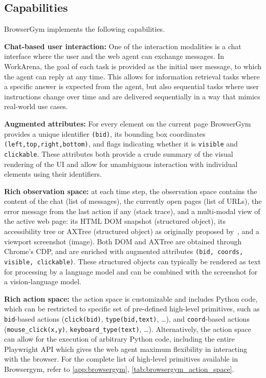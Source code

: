 \documentclass{article}
\theoremstyle{plain}
\theoremstyle{definition}
\theoremstyle{remark}
\begin{document}
\subsection{Capabilities}\label{sec:browsergym-features}

BrowserGym implements the following capabilities.

\textbf{Chat-based user interaction:} One of the interaction modalities is a chat interface where the user and the web agent can exchange messages. In WorkArena, the goal of each task is provided as the initial user message, to which the agent can reply at any time. This allows for information retrieval tasks where a specific answer is expected from the agent, but also sequential tasks where user instructions change over time and are delivered sequentially in a way that mimics real-world use cases.

\textbf{Augmented attributes:} For every element on the current page BrowserGym provides a unique identifier \verb|(bid)|, its bounding box coordinates \verb|(left,top,right,bottom)|, and flags indicating whether it is \verb|visible| and \verb|clickable|. These attributes both provide a crude summary of the visual rendering of the UI and allow for unambiguous interaction with individual elements using their identifiers.

\textbf{Rich observation space:} at each time step, the observation space contains the content of the chat (list of messages), the currently open pages (list of URLs), the error message from the last action if any (stack trace), and a multi-modal view of the active web page: its HTML DOM snapshot (structured object), its accessibility tree or AXTree (structured object) as originally proposed by~\citet{zhou2023webarena}, and a viewport screenshot (image). Both DOM and AXTree are obtained through Chrome's CDP, and are enriched with augmented attributes \verb|(bid, coords, visible, clickable)|. These structured objects can typically be rendered as text for processing by a language model and can be combined with the screenshot for a vision-language model.

\textbf{Rich action space:} the action space is customizable and includes Python code, which can be restricted to specific set of pre-defined high-level primitives, such as \verb|bid|-based actions (\verb|click(bid)|, \verb|type(bid,text)|, \dots), and \verb|coord|-based actions (\texttt{mouse\_click(x,y)}, \texttt{keyboard\_type(text)}, \dots). Alternatively, the action space can allow for the execution of arbitrary Python code, including the entire Playwright API which gives the web agent maximum flexibility in interacting with the browser.
For the complete list of high-level primitives available in Browsergym, refer to \cref{app:browsergym}, \cref{tab:browsergym_action_space}.
\end{document}
